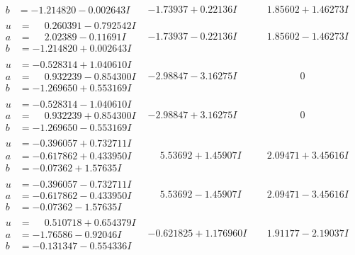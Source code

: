 \documentclass[1p]{elsarticle_modified}
\theoremstyle{definition}
\begin{document}
$$\begin{array}{c|c|c}
\begin{aligned}
b &= -1.214820 - 0.002643 I\end{aligned}
 & -1.73937 + 0.22136 I & \phantom{-}1.85602 + 1.46273 I \\ \hline\begin{aligned}
u &= \phantom{-}0.260391 - 0.792542 I \\
a &= \phantom{-}2.02389 - 0.11691 I \\
b &= -1.214820 + 0.002643 I\end{aligned}
 & -1.73937 - 0.22136 I & \phantom{-}1.85602 - 1.46273 I \\ \hline\begin{aligned}
u &= -0.528314 + 1.040610 I \\
a &= \phantom{-}0.932239 - 0.854300 I \\
b &= -1.269650 + 0.553169 I\end{aligned}
 & -2.98847 - 3.16275 I & \phantom{-0.000000 } 0 \\ \hline\begin{aligned}
u &= -0.528314 - 1.040610 I \\
a &= \phantom{-}0.932239 + 0.854300 I \\
b &= -1.269650 - 0.553169 I\end{aligned}
 & -2.98847 + 3.16275 I & \phantom{-0.000000 } 0 \\ \hline\begin{aligned}
u &= -0.396057 + 0.732711 I \\
a &= -0.617862 + 0.433950 I \\
b &= -0.07362 + 1.57635 I\end{aligned}
 & \phantom{-}5.53692 + 1.45907 I & \phantom{-}2.09471 + 3.45616 I \\ \hline\begin{aligned}
u &= -0.396057 - 0.732711 I \\
a &= -0.617862 - 0.433950 I \\
b &= -0.07362 - 1.57635 I\end{aligned}
 & \phantom{-}5.53692 - 1.45907 I & \phantom{-}2.09471 - 3.45616 I \\ \hline\begin{aligned}
u &= \phantom{-}0.510718 + 0.654379 I \\
a &= -1.76586 - 0.92046 I \\
b &= -0.131347 - 0.554336 I\end{aligned}
 & -0.621825 + 1.176960 I & \phantom{-}1.91177 - 2.19037 I \\ \hline\begin{aligned}

\end{aligned}
\end{array}$$
\end{document}

